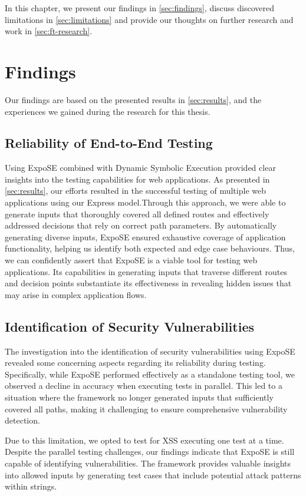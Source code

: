 In this chapter, we present our findings in \autoref{sec:findings}, discuss discovered limitations in \autoref{sec:limitations} and provide our thoughts on further research and work in \autoref{sec:ft-research}.

\section{Findings}
\label{sec:findings}
Our findings are based on the presented results in \autoref{sec:results}, and the experiences we gained during the research for this thesis.

\subsection{Reliability of End-to-End Testing}
Using ExpoSE combined with Dynamic Symbolic Execution provided clear insights into the testing capabilities for web applications. As presented in \autoref{sec:results}, our efforts resulted in the successful testing of multiple web applications using our Express model.Through this approach, we were able to generate inputs that thoroughly covered all defined routes and effectively addressed decisions that rely on correct path parameters. By automatically generating diverse inputs, ExpoSE ensured exhaustive coverage of application functionality, helping us identify both expected and edge case behaviours.
Thus, we can confidently assert that ExpoSE is a viable tool for testing web applications. Its capabilities in generating inputs that traverse different routes and decision points substantiate its effectiveness in revealing hidden issues that may arise in complex application flows. 


\subsection{Identification of Security Vulnerabilities}
The investigation into the identification of security vulnerabilities using ExpoSE revealed some concerning aspects regarding its reliability during testing. Specifically, while ExpoSE performed effectively as a standalone testing tool, we observed a decline in accuracy when executing tests in parallel. This led to a situation where the framework no longer generated inputs that sufficiently covered all paths, making it challenging to ensure comprehensive vulnerability detection.

Due to this limitation, we opted to test for XSS executing one test at a time. Despite the parallel testing challenges, our findings indicate that ExpoSE is still capable of identifying vulnerabilities. The framework provides valuable insights into allowed inputs by generating test cases that include potential attack patterns within strings.

